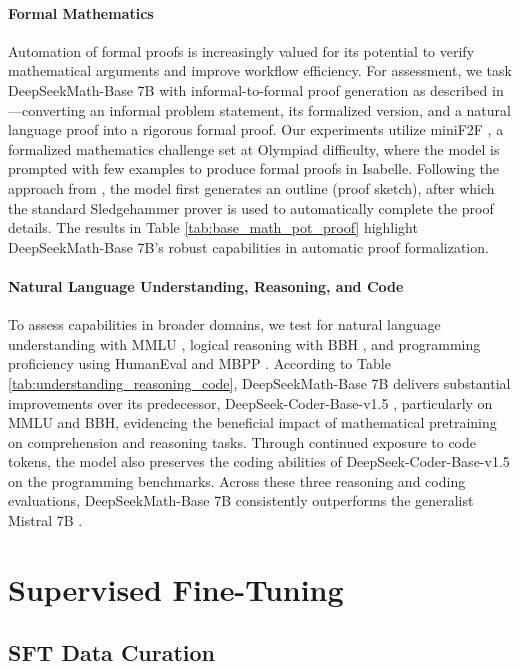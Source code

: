 \paragraph{Formal Mathematics}

Automation of formal proofs is increasingly valued for its potential to verify mathematical arguments and improve workflow efficiency. For assessment, we task DeepSeekMath-Base 7B with informal-to-formal proof generation as described in \citep{dsp_proof}—converting an informal problem statement, its formalized version, and a natural language proof into a rigorous formal proof. Our experiments utilize miniF2F \citep{minif2f}, a formalized mathematics challenge set at Olympiad difficulty, where the model is prompted with few examples to produce formal proofs in Isabelle. Following the approach from \cite{dsp_proof}, the model first generates an outline (proof sketch), after which the standard Sledgehammer prover \citep{sledgehammer} is used to automatically complete the proof details. The results in Table \ref{tab:base_math_pot_proof} highlight DeepSeekMath-Base 7B’s robust capabilities in automatic proof formalization.

\paragraph{Natural Language Understanding, Reasoning, and Code}

To assess capabilities in broader domains, we test for natural language understanding with MMLU \citep{mmlu}, logical reasoning with BBH \citep{bbh}, and programming proficiency using HumanEval \citep{codex} and MBPP \citep{mbpp}. According to Table \ref{tab:understanding_reasoning_code}, DeepSeekMath-Base 7B delivers substantial improvements over its predecessor, DeepSeek-Coder-Base-v1.5 \citep{deepseek-coder}, particularly on MMLU and BBH, evidencing the beneficial impact of mathematical pretraining on comprehension and reasoning tasks. Through continued exposure to code tokens, the model also preserves the coding abilities of DeepSeek-Coder-Base-v1.5 on the programming benchmarks. Across these three reasoning and coding evaluations, DeepSeekMath-Base 7B consistently outperforms the generalist Mistral 7B \citep{mistral}.

\section{Supervised Fine-Tuning}

\subsection{SFT Data Curation}

